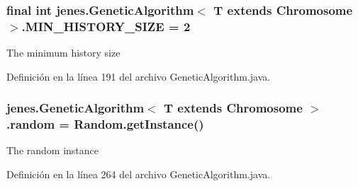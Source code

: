 \hypertarget{classjenes_1_1_genetic_algorithm_3_01_t_01extends_01_chromosome_01_4_aa64b297086826bfbda1fbaccebe4cb24}{
\subsubsection[{M\-I\-N\-\_\-\-H\-I\-S\-T\-O\-R\-Y\-\_\-\-S\-I\-Z\-E}]{\setlength{\rightskip}{0pt plus 5cm}final int jenes.\-Genetic\-Algorithm$<$ T extends Chromosome $>$.M\-I\-N\-\_\-\-H\-I\-S\-T\-O\-R\-Y\-\_\-\-S\-I\-Z\-E = 2\hspace{0.3cm}{\ttfamily [static]}}}\label{classjenes_1_1_genetic_algorithm_3_01_t_01extends_01_chromosome_01_4_aa64b297086826bfbda1fbaccebe4cb24}
The minimum history size 

Definición en la línea 191 del archivo Genetic\-Algorithm.\-java.

\hypertarget{classjenes_1_1_genetic_algorithm_3_01_t_01extends_01_chromosome_01_4_a1579283e210144ba90b937be0911a028}{
\subsubsection[{random}]{ jenes.\-Genetic\-Algorithm$<$ T extends Chromosome $>$.random = {\bf Random.\-get\-Instance}()\hspace{0.3cm}{\ttfamily [protected]}}}\label{classjenes_1_1_genetic_algorithm_3_01_t_01extends_01_chromosome_01_4_a1579283e210144ba90b937be0911a028}
The random instance 

Definición en la línea 264 del archivo Genetic\-Algorithm.\-java.

